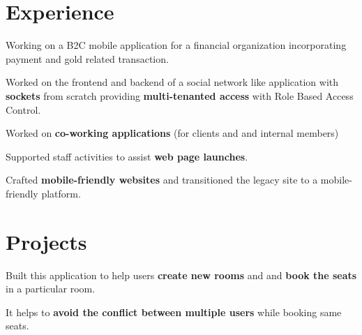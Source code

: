 \documentclass[]{deedy-resume-openfont}
\begin{document}
\hfill
\begin{minipage}[t]{0.66\textwidth} 


\section{Experience}

\vspace{\topsep} %
\begin{tightemize}
\item Working on a B2C mobile application for a financial organization incorporating payment and gold related transaction.
\end{tightemize}

\vspace{\topsep} %
\begin{tightemize}
\item Worked on the frontend and backend of a social network like application with \textbf{sockets} from scratch providing \textbf{multi-tenanted access} with Role Based Access Control.
\item Worked on \textbf{co-working applications} (for clients and and internal members)
\end{tightemize}

\sectionsep

\begin{tightemize}
\item Supported staff activities to assist \textbf{web page launches}.
\item Crafted \textbf{mobile-friendly websites} and transitioned the legacy site to a mobile-friendly platform.
\end{tightemize}

\sectionsep



\section{Projects}
{\href{https://github.com/Niharika100/Niharika100-bookRoom_backend}{\bf{}}}
\begin{tightemize}
\item Built this application to help users \textbf{create new rooms} and and \textbf{book the seats} in a particular room.
\item It helps to \textbf{avoid the conflict between multiple users} while booking same seats.
\end{tightemize}


\end{minipage}
\end{document}
